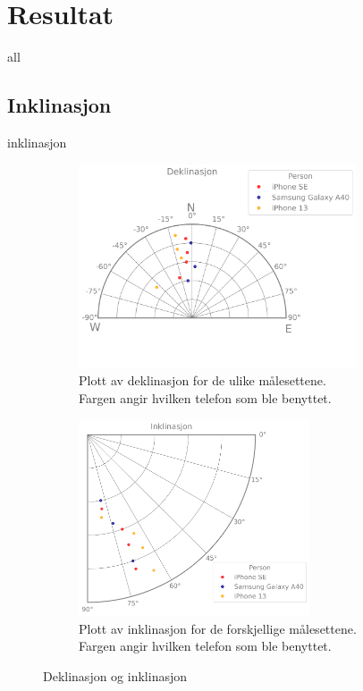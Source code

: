 \section{Resultat}

{all}

\subsection{Inklinasjon}

{inklinasjon}

\begin{figure}
    \centering
\begin{subfigure}{.5\textwidth}
    \includegraphics[width=0.9\textwidth]{Plots/declination.png}
    \caption{Plott av deklinasjon for de ulike målesettene. \\
    Fargen angir hvilken telefon som ble benyttet.}
    \label{fig:plot_declination}
\end{subfigure}%
\begin{subfigure}{.5\textwidth}
    \includegraphics[width=0.75\textwidth]{Plots/inclination.png}
    \caption{Plott av inklinasjon for de forskjellige målesettene. Fargen angir hvilken telefon som ble benyttet.}
    \label{fig:plot_inklination}
\end{subfigure}
    \caption{Deklinasjon og inklinasjon}
    \label{Ink_og_dek}
\end{figure}


